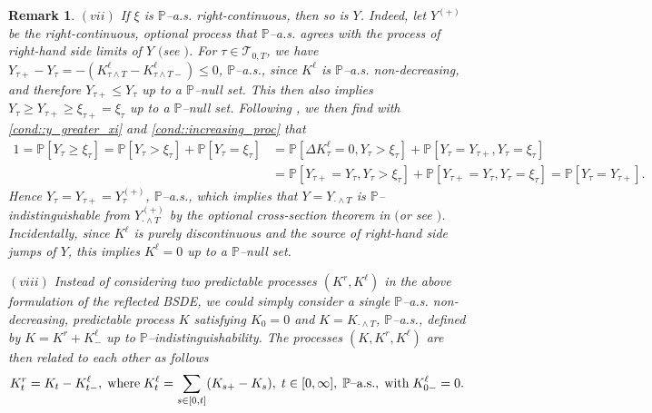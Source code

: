 \documentclass[10pt]{article} %
\newtheorem{remark}[theorem]{Remark}
\newcommand\cT{\mathcal T}
\def \P{\mathbb{P}}
\newcommand{\1}{\mathbf{1}}
\begin{document}
\begin{remark}
	\medskip
	$(vii)$ If $\xi$ is $\P${\rm--a.s.} right-continuous, then so is $Y$. Indeed, let $Y^{(+)}$ be the right-continuous, optional process that {\rm$\P$--a.s.} agrees with the process of right-hand side limits of $Y$ $($see {\rm\cite[Appendix I, Remark 5(b)]{dellacherie1982probabilities}}$)$. For $\tau \in \cT_{0,T}$, we have $Y_{\tau+} - Y_\tau = -( K^\ell_{\tau \land T} - K^\ell_{{\tau \land T}-}) \leq 0$, {\rm$\P$--a.s.}, since $K^\ell$ is {$\P$--a.s.} non-decreasing, and therefore $Y_{\tau+} \leq Y_\tau$ up to a {\rm$\P$--null set}. This then also implies $Y_\tau \geq Y_{\tau+} \geq \xi_{\tau+} = \xi_\tau$ up to a {\rm$\P$--null set}. Following {\rm\cite[Remark 3.3]{grigorova2017reflected}}, we then find with \ref{cond::y_greater_xi} and \ref{cond::increasing_proc} that 
		\begin{align*}
			1 = \P[Y_\tau \geq \xi_\tau] = \P[Y_\tau > \xi_\tau] + \P[Y_\tau = \xi_\tau] &= \P[\Delta K^\ell_\tau = 0, Y_\tau > \xi_\tau] + \P[Y_\tau = Y_{\tau+},Y_\tau = \xi_\tau] \\
			&= \P[Y_{\tau+} = Y_\tau, Y_\tau > \xi_\tau] + \P[Y_{\tau+} = Y_\tau, Y_\tau = \xi_\tau] = \P[Y_\tau=Y_{\tau+}].
		\end{align*}
		Hence $Y_\tau = Y_{\tau+} = Y^{(+)}_\tau$, $\P${\rm--a.s.}, which implies that $Y = Y_{\cdot\land T}$ is $\P$--indistinguishable from $Y^{(+)}_{\cdot\land T}$ by the optional cross-section theorem in {\rm\cite[Theorem IV.84, p. 137]{dellacherie1978probabilities}} $($or see {\rm{}}$)$. Incidentally, since $K^\ell$ is purely discontinuous and the source of right-hand side jumps of $Y$, this implies $K^\ell = 0$ up to a {\rm$\P$--null set}.
		
	\medskip
	$(viii)$ Instead of considering two predictable processes $(K^r,K^\ell)$ in the above formulation of the reflected {\rm BSDE}, we could simply consider a single $\P$--{\rm a.s.} non-decreasing, predictable process $K$  satisfying $K_0 = 0$ and $K = K_{\cdot \land T}$, $\P$--{\rm a.s.}, defined by $K = K^r + K^\ell_-$ up to $\P$--indistinguishability. The processes $(K,K^r,K^\ell)$ are then related to each other as follows
		\begin{equation*}
			K^r_t = K_t- K^\ell_{t-}, \; \text{\rm where} \; K^\ell_t = \sum_{s \in [0,t]} (K_{s+} - K_s), \; t \in [0,\infty], \; \text{$\P$\rm--a.s.},\;  \text{with} \; K^\ell_{0-} = 0.
		\end{equation*}
\end{remark}
\end{document}
